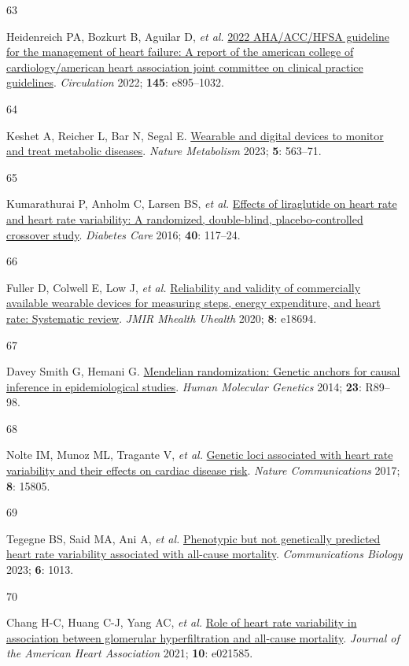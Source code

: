 \documentclass[
  a4paper,
  headsepline=true,
  open=any]{scrbook}
\newlength{\cslhangindent}
\newlength{\csllabelwidth}
\newlength{\cslentryspacingunit} %
\newenvironment{CSLReferences}[2] %
 {%
  \setlength{\parindent}{0pt}
  \ifodd #1
  \let\oldpar\par
  \def\par{\hangindent=\cslhangindent\oldpar}
  \fi
  \setlength{\parskip}{#2\cslentryspacingunit}
 }%
 {}
\newcommand{\CSLLeftMargin}[1]{\parbox[t]{\csllabelwidth}{#1}}
\newcommand{\CSLRightInline}[1]{\parbox[t]{\linewidth - \csllabelwidth}{#1}\break}
\begin{document}
\begin{CSLReferences}{0}{0}
\leavevmode{}%
\CSLLeftMargin{63 }%
\CSLRightInline{Heidenreich PA, Bozkurt B, Aguilar D, \emph{et al.}
\href{https://doi.org/10.1161/CIR.0000000000001063}{2022 AHA/ACC/HFSA
guideline for the management of heart failure: A report of the american
college of cardiology/american heart association joint committee on
clinical practice guidelines}. \emph{Circulation} 2022; \textbf{145}:
e895--1032.}

\leavevmode{}%
\CSLLeftMargin{64 }%
\CSLRightInline{Keshet A, Reicher L, Bar N, Segal E.
\href{https://doi.org/10.1038/s42255-023-00778-y}{Wearable and digital
devices to monitor and treat metabolic diseases}. \emph{Nature
Metabolism} 2023; \textbf{5}: 563--71.}

\leavevmode{}%
\CSLLeftMargin{65 }%
\CSLRightInline{Kumarathurai P, Anholm C, Larsen BS, \emph{et al.}
\href{https://doi.org/10.2337/dc16-1580}{Effects of liraglutide on heart
rate and heart rate variability: A randomized, double-blind,
placebo-controlled crossover study}. \emph{Diabetes Care} 2016;
\textbf{40}: 117--24.}

\leavevmode{}%
\CSLLeftMargin{66 }%
\CSLRightInline{Fuller D, Colwell E, Low J, \emph{et al.}
\href{https://doi.org/10.2196/18694}{Reliability and validity of
commercially available wearable devices for measuring steps, energy
expenditure, and heart rate: Systematic review}. \emph{JMIR Mhealth
Uhealth} 2020; \textbf{8}: e18694.}

\leavevmode{}%
\CSLLeftMargin{67 }%
\CSLRightInline{Davey Smith G, Hemani G.
\href{https://doi.org/10.1093/hmg/ddu328}{Mendelian randomization:
Genetic anchors for causal inference in epidemiological studies}.
\emph{Human Molecular Genetics} 2014; \textbf{23}: R89--98.}

\leavevmode{}%
\CSLLeftMargin{68 }%
\CSLRightInline{Nolte IM, Munoz ML, Tragante V, \emph{et al.}
\href{https://doi.org/10.1038/ncomms15805}{Genetic loci associated with
heart rate variability and their effects on cardiac disease risk}.
\emph{Nature Communications} 2017; \textbf{8}: 15805.}

\leavevmode{}%
\CSLLeftMargin{69 }%
\CSLRightInline{Tegegne BS, Said MA, Ani A, \emph{et al.}
\href{https://doi.org/10.1038/s42003-023-05376-y}{Phenotypic but not
genetically predicted heart rate variability associated with all-cause
mortality}. \emph{Communications Biology} 2023; \textbf{6}: 1013.}

\leavevmode{}%
\CSLLeftMargin{70 }%
\CSLRightInline{Chang H-C, Huang C-J, Yang AC, \emph{et al.}
\href{https://doi.org/10.1161/JAHA.121.021585}{Role of heart rate
variability in association between glomerular hyperfiltration and
all{-}cause mortality}. \emph{Journal of the American Heart Association}
2021; \textbf{10}: e021585.}

\end{CSLReferences}
\end{document}
